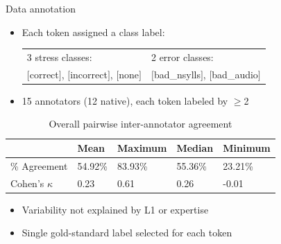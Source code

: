\documentclass[xcolor={dvipsnames}]{beamer}
\begin{document}
\begin{frame}{Data annotation}
\begin{itemize}
\item{Each token assigned a class label:

	\begin{center}
	\begin{tabular}{ll}
	3 stress classes: & 2 error classes: \\
	$[$correct$]$, $[$incorrect$]$, $[$none$]$ &  $[$bad\_nsylls$]$, $[$bad\_audio$]$ \\
	\end{tabular}
	\end{center}
	
}
\item{15 annotators (12 native), each token labeled by $\geq$2}
\end{itemize}

		\begin{table}
			\centering
			\small
			\caption{Overall pairwise inter-annotator agreement}
			\begin{tabularx}{\textwidth}{lXXXX}
			\toprule
			 								& Mean & Maximum & Median & Minimum \\
			 \midrule
			 \% Agreement 		& 54.92\% & 83.93\% & 55.36\% & 23.21\% \\
			 Cohen's $\kappa$	& 0.23 & 0.61 & 0.26 & -0.01 \\
			 \bottomrule
			\end{tabularx}					
			\label{tab:agreement:overall}
		\end{table}

\begin{itemize}
\item{Variability not explained by L1 or expertise}
\item{Single gold-standard label selected for each token}
\end{itemize}

\end{frame}


\end{document}
